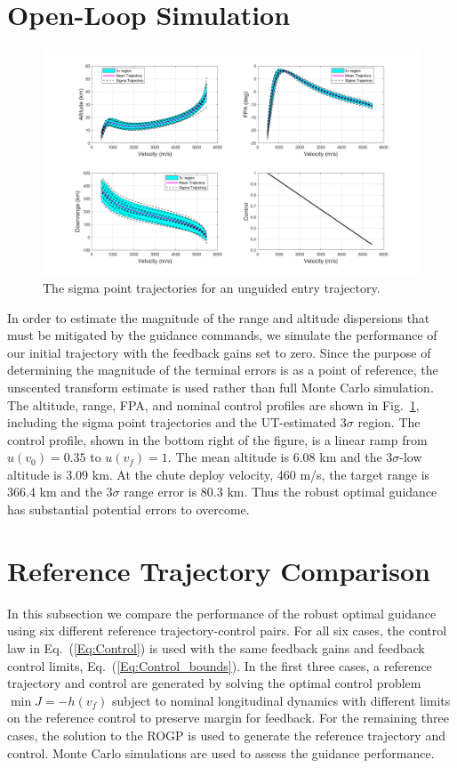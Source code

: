 \section{Open-Loop Simulation}
\begin{figure}[h!]
	\centering
	\includegraphics[width=1\textwidth]{../PropellantOptimalJournal/ddp/matlab/HeavyOpenLoopGrid}
	\caption{The sigma point trajectories for an unguided entry trajectory.}
	\label{Fig:OpenLoop}
\end{figure}
In order to estimate the magnitude of the range and altitude dispersions that must be mitigated by the guidance commands, we simulate the performance of our initial trajectory with the feedback gains set to zero. Since the purpose of determining the magnitude of the terminal errors is as a point of reference, the unscented transform estimate is used rather than full Monte Carlo simulation. The altitude, range, FPA, and nominal control profiles are shown in Fig.~\ref{Fig:OpenLoop}, including the sigma point trajectories and the UT-estimated 3$\sigma$ region. The control profile, shown in the bottom right of the figure, is a linear ramp from $u(v_0)=0.35$ to $ u(v_f)=1 $. The mean altitude is 6.08 km and the 3$\sigma$-low altitude is 3.09 km. At the chute deploy velocity, 460 m/s, the target range is 366.4 km and the 3$\sigma$ range error is $80.3$ km. Thus the robust optimal guidance has substantial potential errors to overcome.

\section{Reference Trajectory Comparison}
In this subsection we compare the performance of the robust optimal guidance using six different reference trajectory-control pairs. For all six cases, the control law in Eq.~(\ref{Eq:Control}) is used with the same feedback gains and feedback control limits, Eq.~(\ref{Eq:Control_bounds}). In the first three cases, a reference trajectory and control are generated by solving the optimal control problem $\min J = -h(v_f)$ subject to nominal longitudinal dynamics with different limits on the reference control to preserve margin for feedback. For the remaining three cases, the solution to the ROGP is used to generate the reference trajectory and control. Monte Carlo simulations are used to assess the guidance performance.

